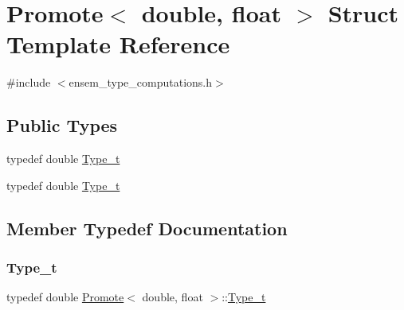 \hypertarget{structPromote_3_01double_00_01float_01_4}{}\section{Promote$<$ double, float $>$ Struct Template Reference}
\label{structPromote_3_01double_00_01float_01_4}


{\ttfamily \#include $<$ensem\+\_\+type\+\_\+computations.\+h$>$}

\subsection*{Public Types}
\begin{DoxyCompactItemize}
\item 
typedef double \mbox{\hyperlink{structPromote_3_01double_00_01float_01_4_a13a1db5ec3dbe8a0dbe04bfa1602202c}{Type\+\_\+t}}
\item 
typedef double \mbox{\hyperlink{structPromote_3_01double_00_01float_01_4_a13a1db5ec3dbe8a0dbe04bfa1602202c}{Type\+\_\+t}}
\end{DoxyCompactItemize}


\subsection{Member Typedef Documentation}
\mbox{\label{structPromote_3_01double_00_01float_01_4_a13a1db5ec3dbe8a0dbe04bfa1602202c}} 
\subsubsection{\texorpdfstring{Type\_t}{Type\_t}\hspace{0.1cm}{\footnotesize\ttfamily [1/2]}}
{\footnotesize\ttfamily typedef double \mbox{\hyperlink{structPromote}{Promote}}$<$ double, float $>$\+::\mbox{\hyperlink{structPromote_3_01double_00_01float_01_4_a13a1db5ec3dbe8a0dbe04bfa1602202c}{Type\+\_\+t}}}

\mbox{\label{structPromote_3_01double_00_01float_01_4_a13a1db5ec3dbe8a0dbe04bfa1602202c}} 
